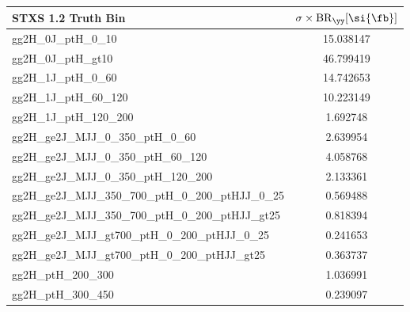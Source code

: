 \begin{table}[htbp]
        \centering
        {\footnotesize
        \begin{tabular}{lS}
                STXS 1.2 Truth Bin                                     & {$\sigma\times\mathrm{BR}_{\yy} [\si{\fb}]$} \\
                \toprule
                gg2H\_0J\_ptH\_0\_10                                   & 15.038147                                    \\
                gg2H\_0J\_ptH\_gt10                                    & 46.799419                                    \\
                gg2H\_1J\_ptH\_0\_60                                   & 14.742653                                    \\
                gg2H\_1J\_ptH\_60\_120                                 & 10.223149                                    \\
                gg2H\_1J\_ptH\_120\_200                                & 1.692748                                     \\
                gg2H\_ge2J\_MJJ\_0\_350\_ptH\_0\_60                    & 2.639954                                     \\
                gg2H\_ge2J\_MJJ\_0\_350\_ptH\_60\_120                  & 4.058768                                     \\
                gg2H\_ge2J\_MJJ\_0\_350\_ptH\_120\_200                 & 2.133361                                     \\
                gg2H\_ge2J\_MJJ\_350\_700\_ptH\_0\_200\_ptHJJ\_0\_25   & 0.569488                                     \\
                gg2H\_ge2J\_MJJ\_350\_700\_ptH\_0\_200\_ptHJJ\_gt25    & 0.818394                                     \\
                gg2H\_ge2J\_MJJ\_gt700\_ptH\_0\_200\_ptHJJ\_0\_25      & 0.241653                                     \\
                gg2H\_ge2J\_MJJ\_gt700\_ptH\_0\_200\_ptHJJ\_gt25       & 0.363737                                     \\
                gg2H\_ptH\_200\_300                                    & 1.036991                                     \\
                gg2H\_ptH\_300\_450                                    & 0.239097                                     \\

\end{tabular}}
\end{table}

